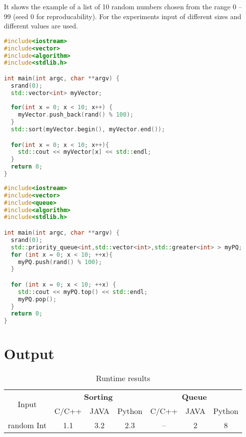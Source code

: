 \documentclass[
    12pt,
    a4paper,
    oneside, 
    headinclude,footinclude,
    BCOR5mm,
]{scrartcl}
\begin{document}
It shows the example of a list of 10 random numbers chosen from the range 0 -- 99 (seed 0 for reproducability).
For the experiments input of different sizes and different values are used.

\begin{lstlisting}[language=C++, caption=Sorting in C++]
#include<iostream>
#include<vector>
#include<algorithm>
#include<stdlib.h>

int main(int argc, char **argv) {
  srand(0);
  std::vector<int> myVector;
  
  for(int x = 0; x < 10; x++) {
    myVector.push_back(rand() % 100);
  }
  std::sort(myVector.begin(), myVector.end());

  for(int x = 0; x < 10; x++){
    std::cout << myVector[x] << std::endl;
  }
  return 0;
}
\end{lstlisting}

\begin{lstlisting}[language=C++, caption=Priority Queue in C++]
#include<iostream>
#include<vector>
#include<queue>
#include<algorithm>
#include<stdlib.h>

int main(int argc, char **argv) {
  srand(0);
  std::priority_queue<int,std::vector<int>,std::greater<int> > myPQ;
  for (int x = 0; x < 10; ++x){
    myPQ.push(rand() % 100);
  }

  for (int x = 0; x < 10; ++x) {
    std::cout << myPQ.top() << std::endl;
    myPQ.pop();
  }
  return 0;
}
\end{lstlisting}





\section*{Output}

\begin{table}
\caption{Runtime results}
\begin{center}
\begin{tabular}{c|ccc|ccc}
\hline
\multirow{2}{*}{Input} & \multicolumn{3}{c}{\textbf{Sorting}} & \multicolumn{3}{c}{\textbf{Queue}} \\
 & C/C++ & JAVA & Python & C/C++ & JAVA & Python	\\
\hline
random Int & 1.1 & 3.2 & 2.3 & -- & 2 & 8 \\
\hline
\end{tabular}
\end{center}
\label{tab:output}
\end{table}
\end{document}
